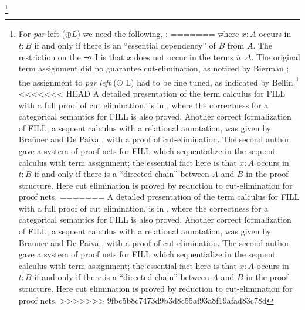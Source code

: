 \footnote{For \emph{par} left ($\oplus L$) we need the following, :
=======
where $x: A$ occurs in $t:B$ if and only if there is an ``essential
dependency'' of $B$ from $A$.  The restriction on the $\mathrel{-\!\circ}$ I is
that $x$ does not occur in the terms $\overline{u}:\Delta$.  The
original term assignment did no guarantee cut-elimination, as noticed
by Bierman \cite{Bierman:1996}; the assignment to \emph{par left}
($\oplus$ L) had to be fine tuned, as indicated by Bellin
\cite{Bellin:1997}
\footnote{For \emph{par} left ($\oplus L$) we need the following:
>>>>>>> 9fbc5b8c7473d9b3d8c55af93a8f19afad83c78d
\[
\AxiomC{$x:A, \overline{x}:\Gamma\vdash \overline{r}: \Delta\qquad y:B, \overline{y}:\Pi\vdash \overline{s}: \Lambda$}
\UnaryInfC{$z: A \oplus B, \overline{x}:\Gamma, \overline{y}:\Pi\vdash  \overline{r'}: \Delta, 
\overline{s'}: \Lambda $}
\DisplayProof
\]
where for $r'_i\in \overline{r'}$ and $s'_j \in \overline{s'}$ we have 
\[
\begin{tabular}{rll}
$r'_i =$ & $\mathtt{let}\ z\ \mathtt{be}\ x-\ \mathtt{in}\ r_i, \qquad$ & if $x$ occurs in $r_i$, \\
             & $r_i$                                                                              & otherwise.\\
$s'_j =$ & $\mathtt{let}\ z\ \mathtt{be}\ -y\ \mathtt{in}\ s_j, \qquad$ & if $y$ occurs in $s_j$, \\
             & $s_j$                                                                              & otherwise.\\
\end{tabular}
\]
We may introduce non-existent dependencies if we define always $r'_i =
\mathtt{let}\ z\ \mathtt{be}\ x-\ \mathtt{in}\ r_i.$
}
<<<<<<< HEAD
A detailed presentation of the term calculus for FILL with a full proof of cut elimination, is in \cite{EadesDePaiva2016}, 
where the correctness for a categorical semantics for FILL is also proved.
Another correct formalization of FILL, a sequent calculus with a relational annotation, was given by Bra\"uner and De Paiva \cite{BraunedDePaiva:1997}, with a proof of cut-elimination.
The second author \cite{Bellin:1997} gave a system of proof nets for FILL which sequentialize in the sequent calculus
with term assignment; the essential fact here is that $x:A$ occurs in $t:B$ if and only if there is a ``directed chain''
between $A$ and $B$ in the proof structure. Here cut elimination is proved by reduction to cut-elimination for proof nets.  
=======
A detailed presentation of the term calculus for FILL with a full
proof of cut elimination, is in \cite{EadesDePaiva2016}, where the
correctness for a categorical semantics for FILL is also proved.
Another correct formalization of FILL, a sequent calculus with a
relational annotation, was given by Bra\"uner and De Paiva
\cite{BraunedDePaiva:1997}, with a proof of cut-elimination.  The
second author \cite{Bellin1997} gave a system of proof nets for FILL
which sequentialize in the sequent calculus with term assignment; the
essential fact here is that $x:A$ occurs in $t:B$ if and only if there
is a ``directed chain'' between $A$ and $B$ in the proof
structure. Here cut elimination is proved by reduction to
cut-elimination for proof nets.
>>>>>>> 9fbc5b8c7473d9b3d8c55af93a8f19afad83c78d

}
